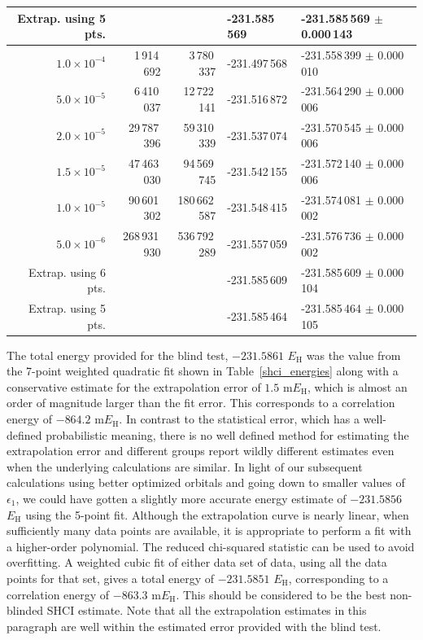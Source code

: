 \documentclass[journal=jcp,manuscript=suppinfo]{achemso}
\begin{document}
\begin{table}[ht!]
\begin{center}
\begin{tabular}{rrrll}
Extrap. using 5 pts. &&&                               -231.585\,569   & -231.585\,569 $\pm$ 0.000\,143 \\
\midrule
$1.0 \times 10^{-4}$ &   1\,914\,692 &   3\,780\,337 & -231.497\,568   & -231.558\,399 $\pm$ 0.000\,010 \\
$5.0 \times 10^{-5}$ &   6\,410\,037 &  12\,722\,141 & -231.516\,872   & -231.564\,290 $\pm$ 0.000\,006 \\
$2.0 \times 10^{-5}$ &  29\,787\,396 &  59\,310\,339 & -231.537\,074   & -231.570\,545 $\pm$ 0.000\,006 \\
$1.5 \times 10^{-5}$ &  47\,463\,030 &  94\,569\,745 & -231.542\,155   & -231.572\,140 $\pm$ 0.000\,006 \\
$1.0 \times 10^{-5}$ &  90\,601\,302 & 180\,662\,587 & -231.548\,415   & -231.574\,081 $\pm$ 0.000\,002 \\
$5.0 \times 10^{-6}$ & 268\,931\,930 & 536\,792\,289 & -231.557\,059   & -231.576\,736 $\pm$ 0.000\,002 \\
Extrap. using 6 pts. &&&                               -231.585\,609   & -231.585\,609 $\pm$ 0.000\,104 \\
Extrap. using 5 pts. &&&                               -231.585\,464   & -231.585\,464 $\pm$ 0.000\,105 \\
\midrule
\end{tabular}
\end{center}
\end{table}
%
The total energy provided for the blind test, $-231.5861$ $E_{\text{H}}$ was the value from the 7-point weighted quadratic fit shown in Table~\ref{shci_energies} along with a conservative estimate for the extrapolation error of $1.5$ m$E_{\text{H}}$, which is almost an order of magnitude larger than the fit error. This corresponds to a correlation energy of $-864.2$ m$E_{\text{H}}$. In contrast to the statistical error, which has a well-defined probabilistic meaning, there is no well defined method for estimating the extrapolation error and different groups report wildly different estimates even when the underlying calculations are similar. In light of our subsequent calculations using better optimized orbitals and going down to smaller values of $\epsilon_1$, we could have gotten a slightly more accurate energy estimate of $-231.5856$ $E_{\text{H}}$ using the 5-point fit. Although the extrapolation curve is nearly linear, when sufficiently many data points are available, it is appropriate to perform a fit with a higher-order polynomial. The reduced chi-squared statistic can be used to avoid overfitting. A weighted cubic fit of either data set of data, using all the data points for that set, gives a total energy of $-231.5851$ $E_{\text{H}}$, corresponding to a correlation energy of
$-863.3$ m$E_{\text{H}}$. This should be considered to be the best non-blinded SHCI estimate. Note that all the extrapolation estimates in this paragraph are well within the estimated error provided with the blind test.\\
\end{document}
